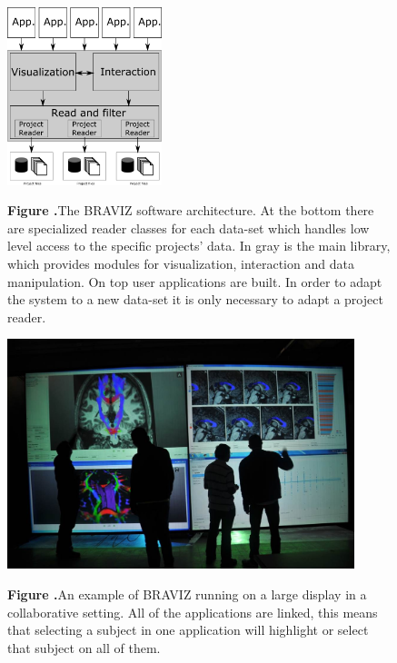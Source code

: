 \documentclass[utf8,paper]{frontiersSCNS} %
\begin{document}
\begin{figure}[h!]
\begin{center}
\includegraphics[width=0.4\textwidth]{figures/arquitecture.png}
\end{center}
 \textbf{\label{fig_arch} Figure .}{The BRAVIZ software architecture. At the bottom there are specialized reader classes for each data-set which handles low level access to the specific projects' data. In gray is the main  library, which provides modules for visualization, interaction and data manipulation. On top user applications are built. In order to adapt the system to a new data-set it is only necessary to adapt a project reader.}
\end{figure}

\begin{figure}[h!]
\begin{center}
\includegraphics[width=0.9\textwidth]{figures/imagine.jpg}
\end{center}
 \textbf{\label{fig_imagine} Figure .}{An example of BRAVIZ running on a large display in a collaborative setting. All of the applications are linked, this means that selecting a subject in one application will highlight or select that subject on all of them.}
\end{figure}
\end{document}
